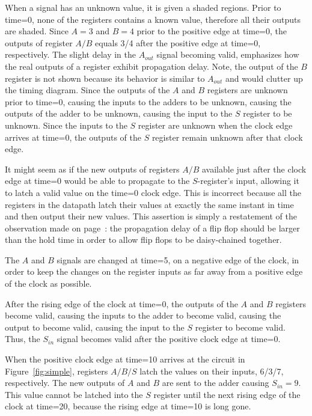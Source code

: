When a signal has an unknown value, it is given a shaded regions.  Prior to 
time=0, none of the registers contains a known value, therefore all 
their outputs are shaded.  Since $A=3$ and $B=4$ prior to the 
positive edge at time=0, the outputs of register $A/B$ equals 3/4 
after the positive edge at time=0, respectively. The slight delay 
in the $A_{out}$ signal becoming valid, emphasizes how the 
real outputs of a register exhibit propagation delay. Note, the output of the
$B$ register is not shown because its behavior is similar to $A_{out}$ and
would clutter up the timing diagram.  Since the outputs of the $A$ and $B$ 
registers are unknown prior to time=0, causing the 
inputs to the adders to be unknown, causing the outputs of the 
adder to be unknown, causing the input to the $S$ register to be 
unknown.  Since the inputs to the $S$ 
register are unknown when the clock edge arrives at time=0, the outputs of the
$S$ register remain unknown after that clock edge.  

It might seem as if the new outputs of registers $A/B$ available 
just after the clock edge at time=0 would be able to propagate 
to the $S$-register's input, allowing it to latch a valid value 
on the time=0 clock edge.  This is incorrect because all the
registers in the datapath latch their values at exactly the same 
instant in time and then output their new values.  This assertion 
is simply a restatement of the observation made on 
page~\pageref{page:FFdelay}: the propagation delay of a flip flop 
should be larger than the hold time in order to allow flip flops 
to be daisy-chained together.

The $A$ and $B$ signals are changed at time=5, on a negative edge 
of the clock, in order to keep the changes on the register inputs 
as far away from a positive edge of the clock as possible.

After the rising edge of the clock at time=0, the outputs of the 
$A$ and $B$ registers become valid, causing the inputs to the adder 
to become valid, causing the output to become valid, causing the 
input to the $S$ register to become valid.  Thus, the $S_{in}$ 
signal becomes valid after the positive clock edge at time=0.

When the positive clock edge at time=10 arrives at the circuit in 
Figure~\ref{fig:simple}, registers $A/B/S$ latch the values on their 
inputs, 6/3/7, respectively.  The new outputs of $A$ and $B$ are 
sent to the adder causing $S_{in} = 9$.  This value cannot be 
latched into the $S$ register until the next rising edge of the 
clock at time=20, because the rising edge at time=10 is long gone.

